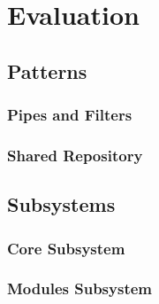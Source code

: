 
\clearpage
\chapter{Evaluation}
\label{ch:evaluation}

\section{Patterns}
\subsection{Pipes and Filters}
\subsection{Shared Repository}



\section{Subsystems}
\subsection{Core Subsystem}
\subsection{Modules Subsystem}